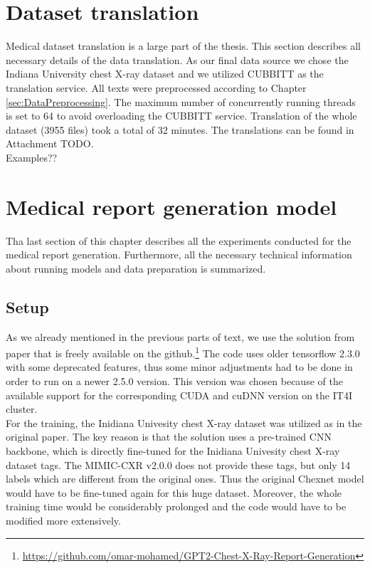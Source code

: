 \section{Dataset translation}
Medical dataset translation is a large part of the thesis. This section describes all necessary details of the data translation. As our final data source we chose the Indiana University chest X-ray dataset and we utilized CUBBITT as the translation service. All texts were preprocessed according to Chapter \ref{sec:DataPreprocessing}. The maximum number of concurrently running threads is set to 64 to avoid overloading the CUBBITT service. Translation of the whole dataset (3955 files) took a total of 32 minutes. The translations can be found in Attachment TODO.\\

Examples??

\section{Medical report generation model}
Tha last section of this chapter describes all the experiments conducted for the medical report generation. Furthermore, all the necessary technical information about running models and data preparation is summarized.

\subsection{Setup}
As we already mentioned in the previous parts of text, we use the solution from \citet{alfarghaly2021automated} paper that is freely available on the github.\footnote[8]{\url{https://github.com/omar-mohamed/GPT2-Chest-X-Ray-Report-Generation}} The code uses older tensorflow 2.3.0 with some deprecated features, thus some minor adjustments had to be done in order to run on a newer 2.5.0 version. This version was chosen because of the available support for the corresponding CUDA and cuDNN version on the IT4I cluster. \\

For the training, the Inidiana Univesity chest X-ray dataset was utilized as in the original paper. The key reason is that the solution uses a pre-trained CNN backbone, which is directly fine-tuned for the Inidiana Univesity chest X-ray dataset tags. The MIMIC-CXR v2.0.0 does not provide these tags, but only 14 labels which are different from the original ones. Thus the original Chexnet model would have to be fine-tuned again for this huge dataset. Moreover, the whole training time would be considerably prolonged and the code would have to be modified more extensively.\\
 
